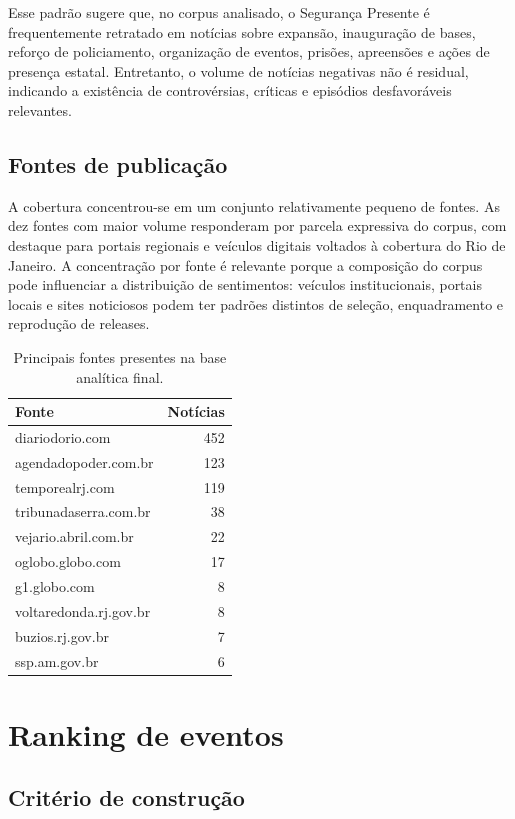 \documentclass[12pt,a4paper]{article}
\begin{document}
Esse padrão sugere que, no corpus analisado, o Segurança Presente é frequentemente retratado em notícias sobre expansão, inauguração de bases, reforço de policiamento, organização de eventos, prisões, apreensões e ações de presença estatal. Entretanto, o volume de notícias negativas não é residual, indicando a existência de controvérsias, críticas e episódios desfavoráveis relevantes.

\subsection{Fontes de publicação}

A cobertura concentrou-se em um conjunto relativamente pequeno de fontes. As dez fontes com maior volume responderam por parcela expressiva do corpus, com destaque para portais regionais e veículos digitais voltados à cobertura do Rio de Janeiro. A concentração por fonte é relevante porque a composição do corpus pode influenciar a distribuição de sentimentos: veículos institucionais, portais locais e sites noticiosos podem ter padrões distintos de seleção, enquadramento e reprodução de releases.

\begin{table}[H]
\centering
\begin{tabular}{lr}
\toprule
\textbf{Fonte} & \textbf{Notícias} \\
\midrule
diariodorio.com & 452 \\
agendadopoder.com.br & 123 \\
temporealrj.com & 119 \\
tribunadaserra.com.br & 38 \\
vejario.abril.com.br & 22 \\
oglobo.globo.com & 17 \\
g1.globo.com & 8 \\
voltaredonda.rj.gov.br & 8 \\
buzios.rj.gov.br & 7 \\
ssp.am.gov.br & 6 \\
\bottomrule
\end{tabular}
\caption{Principais fontes presentes na base analítica final.}
\end{table}

\section{Ranking de eventos}

\subsection{Critério de construção}
\end{document}
